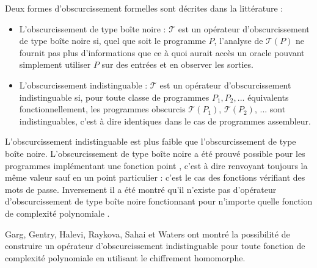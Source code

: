 Deux formes d'obscurcissement formelles sont décrites dans la littérature \cite{BR13} :
\begin{itemize}
 \item L'obscurcissement de type boîte noire : $\mathcal{T}$ est un opérateur d'obscurcissement de type boîte noire si, quel que soit le programme $P$, l'analyse de $\mathcal{T}(P)$ ne fournit pas plus d'informations que ce à quoi aurait accès un oracle pouvant simplement utiliser $P$ sur des entrées et en observer les sorties.
 \item L'obscurcissement indistinguable : $\mathcal{T}$ est un opérateur d'obscurcissement indistinguable si, pour toute classe de programmes $P_1, P_2, ...$ équivalents fonctionnellement, les programmes obscurcis $\mathcal{T}(P_1)$, $\mathcal{T}(P_2)$, ... sont indistinguables, c'est à dire identiques dans le cas de programmes assembleur.
\end{itemize}




L'obscurcissement indistinguable est plus faible que l'obscurcissement de type boîte noire.
L'obscurcissement de type boîte noire a été prouvé possible pour les programmes implémentant une fonction point \cite{LPS04}, c'est à dire renvoyant toujours la même valeur sauf en un point particulier : c'est le cas des fonctions vérifiant des mots de passe. 
Inversement il a été montré qu'il n'existe pas d'opérateur d'obscurcissement de type boîte noire fonctionnant pour n'importe quelle fonction de complexité polynomiale \cite{BGI12}.

Garg, Gentry, Halevi, Raykova, Sahai et Waters \cite{GGH13} ont montré la possibilité de construire un opérateur d'obscurcissement indistinguable pour toute fonction de complexité polynomiale en utilisant le chiffrement homomorphe.
\\

